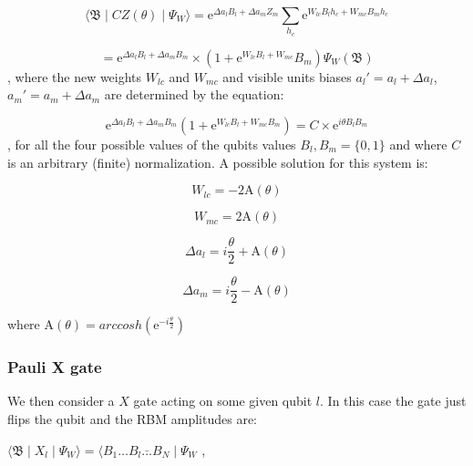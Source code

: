 \begin{equation}
    \langle \mathfrak{B} \mid CZ(\theta) \mid \Psi_{W}  \rangle = 
    \mathrm{e}^{\Delta a_{l} B_{l} + \Delta a_{m} Z_{m}} \sum_{h_{c}}\mathrm{e}^{W_{lc} B_{l} h_{c} + W_{mc} B_{m} h_{c}}
\end{equation}

\begin{equation}
    = \mathrm{e}^{\Delta a_{l} B_{l} + \Delta a_{m} B_{m}} \times (1 + \mathrm{e}^{W_{lc} B_{l} + W_{mc}} B_{m}) \Psi_{W}(\mathfrak{B})
\end{equation}
, where the new weights $W_{lc}$ and $W_{mc}$ and visible units biases $a_{l}\prime= a_{l} + \Delta a_{l}$,
$a_{m}\prime= a_{m} + \Delta a_{m}$ are determined by the equation:

\begin{equation}
   \mathrm{e}^{\Delta a_{l} B_{l} + \Delta a_{m} B_{m}}(1 + \mathrm{e}^{W_{lc} B_{l} + W_{mc} B_{m}}) = C \times \mathrm{e}^{i \theta B_{l} B_{m}} 
\end{equation}
, for all the four possible values of the qubits values $B_{l}, B_{m} = \{0,1\}$ and where $C$ is an arbitrary (finite)
normalization. A possible solution for this system is:

\begin{equation}
   W_{lc} = -2\mathrm{A}(\theta) 
\end{equation}

\begin{equation}
   W_{mc} = 2\mathrm{A}(\theta) 
\end{equation}

\begin{equation}
   \Delta a_{l} = i \frac{\theta}{2} + \mathrm{A}(\theta)
\end{equation}

\begin{equation}
   \Delta a_{m} = i \frac{\theta}{2} - \mathrm{A}(\theta)
\end{equation}

where $\mathrm{A}(\theta) = arccosh(\mathrm{e}^{-i \frac{\theta}{2}})$

\subsubsection{Pauli X gate}
We then consider a $X$ gate acting on some given qubit $l$. In this case the gate just flips the qubit
and the RBM amplitudes are:

$
    \langle \mathfrak{B} \mid X_{l} \mid \Psi_{W}  \rangle = 
    \langle B_{1} \dots B_{l}\bar \dots B_{N} \mid \Psi_{W}
$
,

